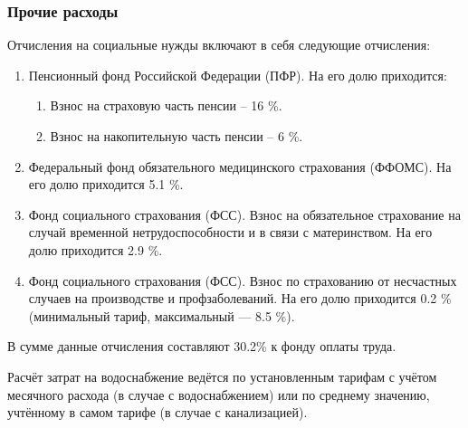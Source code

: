 \subsubsection{Прочие расходы}


Отчисления на социальные нужды включают в себя следующие отчисления:
\begin{enumerate}
  \item Пенсионный фонд Российской Федерации (ПФР). На его долю приходится:
    \begin{enumerate}
      \item Взнос на страховую часть пенсии – 16 \%.
      \item Взнос на накопительную часть пенсии – 6 \%.
    \end{enumerate}
  \item Федеральный фонд обязательного медицинского страхования (ФФОМС). На его долю приходится 5.1 \%.
  \item Фонд социального страхования (ФСС). Взнос на обязательное страхование на случай временной нетрудоспособности и в связи с материнством. На его долю приходится 2.9 \%.
  \item Фонд социального страхования (ФСС). Взнос по страхованию от несчастных случаев на производстве и профзаболеваний. На его долю приходится 0.2 \% (минимальный тариф, максимальный --- 8.5 \%).
\end{enumerate}

В сумме данные отчисления составляют 30.2\% к фонду оплаты труда.


Расчёт затрат на водоснабжение ведётся по установленным тарифам с учётом месячного расхода (в случае с водоснабжением) или по среднему значению, учтённому в самом тарифе (в случае с канализацией).

